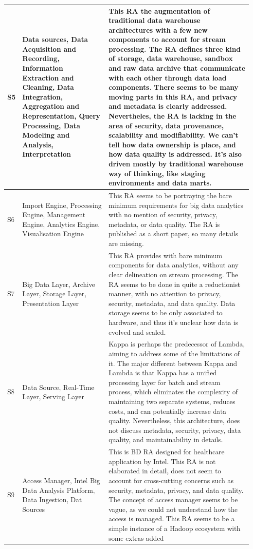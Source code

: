 \documentclass[review]{elsarticle}
\begin{document}
\begin{table}[h!]
\begin{tabular}{ |p{0.5cm}|p{3cm}|p{7.5cm}| }
        \hline
        S5 & Data sources, Data Acquisition and Recording, Information Extraction and Cleaning, Data Integration, Aggregation and Representation, Query Processing, Data Modeling and Analysis, Interpretation & This RA the augmentation of traditional data warehouse architectures with a few new components to account for stream processing. The RA defines three kind of storage, data warehouse, sandbox and raw data archive that communicate with each other through data load components. There seems to be many moving parts in this RA, and privacy and metadata is clearly addressed. Nevertheles, the RA is lacking in the area of security, data provenance, scalability and modifiability. We can't tell how data ownership is place, and how data quality is addressed. It's also driven mostly by traditional warehouse way of thinking, like staging environments and data marts.  \\
        \hline
        S6 & Import Engine, Processing Engine, Management Engine, Analytics Engine, Visualisation Engine & This RA seems to be portraying the bare minimum requirements for big data analytics with no mention of security, privacy, metadata, or data quality. The RA is published as a short paper, so many details are missing. \\
        \hline
        S7 & Big Data Layer, Archive Layer, Storage Layer, Presentation Layer & This RA provides with bare minimum components for data analytics, without any clear delineation on stream processing. The RA seems to be done in quite a reductionist manner, with no attention to privacy, security, metadata, and data quality. Data storage seems to be only associated to hardware, and thus it's unclear how data is evolved and scaled.  \\
        \hline
        S8 & Data Source, Real-Time Layer, Serving Layer  & Kappa is perhaps the predecessor of Lambda, aiming to address some of the limitations of it. The major different between Kappa and Lambda is that Kappa has a unified processing layer for batch and stream process, which eliminates the complexity of maintaining two separate systems, reduces costs, and can potentially increase data quality. Nevertheless, this architecture, does not discuss metadata, security, privacy, data quality, and maintainability in details.  \\
        \hline
        S9 & Access Manager, Intel Big Data Analysis Platform, Data Ingestion, Dat Sources  & This is BD RA designed for healthcare application by Intel. This RA is not elaborated in detail, does not seem to account for cross-cutting concerns such as security, metadata, privacy, and data quality. The concept of access manager seems to be vague, as we could not understand how the access is managed. This RA seems to be a simple instance of a Hadoop ecosystem with some extras added   \\

\end{tabular}
\end{table}
\end{document}
